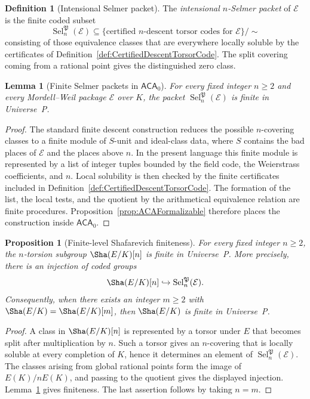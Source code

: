 \documentclass[10pt, reqno]{amsart}
\theoremstyle{plain}
\newtheorem{proposition}[theorem]{Proposition}
\newtheorem{lemma}[theorem]{Lemma}
\theoremstyle{definition}
\newtheorem{definition}[theorem]{Definition}
\theoremstyle{plain}
\newcommand{\Sel}{\operatorname{Sel}}
\begin{document}
\begin{definition}[Intensional Selmer packet]
\label{def:IntensionalSelmerPacket}
The \emph{intensional $n$-Selmer packet} of $\mathcal{E}$ is the finite coded subset
\[
  \Sel^{\mathfrak{P}}_{n}(\mathcal{E})
  \subseteq
  \bigl\{\text{certified $n$-descent torsor codes for }\mathcal{E}\bigr\}\big/{\sim}
\]
consisting of those equivalence classes that are everywhere locally soluble by the certificates of Definition~\ref{def:CertifiedDescentTorsorCode}. The split covering coming from a rational point gives the distinguished zero class.
\end{definition}

\begin{lemma}[Finite Selmer packets in \texorpdfstring{$\mathsf{ACA}_{0}$}{ACA0}]
\label{lem:SelmerPacketFiniteACA0}
For every fixed integer $n\ge 2$ and every Mordell--Weil package $\mathcal{E}$ over $K$, the packet $\Sel^{\mathfrak{P}}_{n}(\mathcal{E})$ is finite in Universe~P.
\end{lemma}

\begin{proof}
The standard finite descent construction reduces the possible $n$-covering classes to a finite module of $S$-unit and ideal-class data, where $S$ contains the bad places of $\mathcal{E}$ and the places above $n$. In the present language this finite module is represented by a list of integer tuples bounded by the field code, the Weierstrass coefficients, and $n$. Local solubility is then checked by the finite certificates included in Definition~\ref{def:CertifiedDescentTorsorCode}. The formation of the list, the local tests, and the quotient by the arithmetical equivalence relation are finite procedures. Proposition~\ref{prop:ACAFormalizable} therefore places the construction inside $\mathsf{ACA}_{0}$.
\end{proof}

\begin{proposition}[Finite-level Shafarevich finiteness]
\label{prop:FiniteLevelShaACA0}
For every fixed integer $n\ge 2$, the $n$-torsion subgroup $\Sha(E/K)[n]$ is finite in Universe~P. More precisely, there is an injection of coded groups
\[
  \Sha(E/K)[n]
  \hookrightarrow
  \Sel^{\mathfrak{P}}_{n}(\mathcal{E}).
\]
Consequently, when there exists an integer $m\ge 2$ with $\Sha(E/K)=\Sha(E/K)[m]$, then $\Sha(E/K)$ is finite in Universe~P.
\end{proposition}

\begin{proof}
A class in $\Sha(E/K)[n]$ is represented by a torsor under $E$ that becomes split after multiplication by $n$. Such a torsor gives an $n$-covering that is locally soluble at every completion of $K$, hence it determines an element of $\Sel^{\mathfrak{P}}_{n}(\mathcal{E})$. The classes arising from global rational points form the image of $E(K)/nE(K)$, and passing to the quotient gives the displayed injection. Lemma~\ref{lem:SelmerPacketFiniteACA0} gives finiteness. The last assertion follows by taking $n=m$.
\end{proof}
\end{document}
